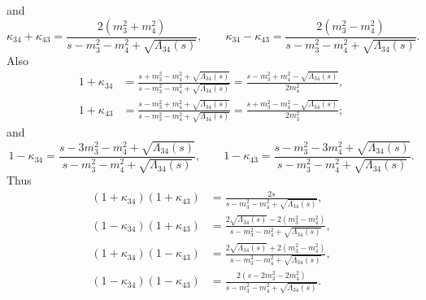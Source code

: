 and
\begin{equation}
	\kappa_{34} + \kappa_{43} = \frac{ 2 \left( m_{3}^{2} + m_{4}^{2} \right)}{s - m_{3}^{2} - m_{4}^{2} + \sqrt{\Lambda_{34}(s)}}, \qquad
	\kappa_{34} - \kappa_{43} = \frac{ 2 \left( m_{3}^{2} - m_{4}^{2} \right)}{s - m_{3}^{2} - m_{4}^{2} + \sqrt{\Lambda_{34}(s)}}.
\end{equation}
Also
\begin{align}
	1 + \kappa_{34} &= \frac{s + m_{3}^{2} - m_{4}^{2} + \sqrt{\Lambda_{34}(s)}}{s - m_{3}^{2} - m_{4}^{2} + \sqrt{\Lambda_{34}(s)}} = \frac{s - m_{3}^{2} + m_{4}^{2} - \sqrt{\Lambda_{34}(s)}}{2m_{4}^{2}}, \\
	1 + \kappa_{43} &= \frac{s - m_{3}^{2} + m_{4}^{2} + \sqrt{\Lambda_{34}(s)}}{s - m_{3}^{2} - m_{4}^{2} + \sqrt{\Lambda_{34}(s)}} = \frac{s + m_{3}^{2} - m_{4}^{2} - \sqrt{\Lambda_{34}(s)}}{2m_{3}^{2}};
\end{align}
and
\begin{equation}
	1 - \kappa_{34} = \frac{s - 3m_{3}^{2} - m_{4}^{2} + \sqrt{\Lambda_{34}(s)}}{s - m_{3}^{2} - m_{4}^{2} + \sqrt{\Lambda_{34}(s)}}, \qquad
	1 - \kappa_{43} = \frac{s - m_{3}^{2} - 3m_{4}^{2} + \sqrt{\Lambda_{34}(s)}}{s - m_{3}^{2} - m_{4}^{2} + \sqrt{\Lambda_{34}(s)}}.
\end{equation}
Thus
\begin{align}
	\left( 1 + \kappa_{34} \right) \left( 1 + \kappa_{43} \right) &= \frac{2s}{s - m_{3}^{2} - m_{4}^{2} + \sqrt{\Lambda_{34}(s)}}, \\
	\left( 1 - \kappa_{34} \right) \left( 1 + \kappa_{43} \right) &= \frac{ 2 \sqrt{\Lambda_{34}(s)} - 2 \left( m_{3}^{2} - m_{4}^{2} \right)}{s - m_{3}^{2} - m_{4}^{2} + \sqrt{\Lambda_{34}(s)}}, \\
	\left( 1 + \kappa_{34} \right) \left( 1 - \kappa_{43} \right) &= \frac{ 2 \sqrt{\Lambda_{34}(s)} + 2 \left( m_{3}^{2} - m_{4}^{2} \right)}{s - m_{3}^{2} - m_{4}^{2} + \sqrt{\Lambda_{34}(s)}}, \\
	\left( 1 - \kappa_{34} \right) \left( 1 - \kappa_{43} \right) &= \frac{ 2 \left( s - 2m_{3}^{2} - 2m_{4}^{2} \right)}{s - m_{3}^{2} - m_{4}^{2} + \sqrt{\Lambda_{34}(s)}}.
\end{align}


